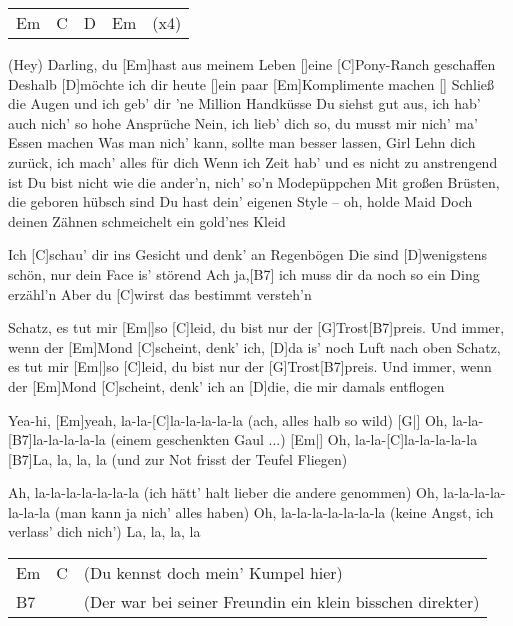 



\begin{guitar}
	{\footnotesize\begin{tabular}{l|l|l|l l}
			Em \optionalChord{B} & C & D \optionalChord{G} & Em \optionalChord{D} & (x4)
	\end{tabular}}

	\songsection{Strophe 1}
	(Hey) Darling, du [Em]hast aus meinem Leben []eine [C]Pony-Ranch geschaffen
	Deshalb [D]möchte ich dir heute []ein paar [Em]Komplimente machen []{}
	Schließ die Augen und ich geb' dir 'ne Million Handküsse
	Du siehst gut aus, ich hab' auch nich' so hohe Ansprüche
	Nein, ich lieb' dich so, du musst mir nich' ma' Essen machen
	Was man nich' kann, sollte man besser lassen, Girl
	Lehn dich zurück, ich mach' alles für dich
	Wenn ich Zeit hab' und es nicht zu anstrengend ist
	Du bist nicht wie die ander'n, nich' so'n Modepüppchen
	Mit großen Brüsten, die geboren hübsch sind
	Du hast dein' eigenen Style – oh, holde Maid
	Doch deinen Zähnen schmeichelt ein gold'nes Kleid
	
	Ich [C]schau' dir ins Gesicht und denk' an Regenbögen
	Die sind [D]wenigstens schön, nur dein Face is' störend
	Ach ja,[B7] ich muss dir da noch so ein Ding erzähl'n
	Aber du [C]wirst das bestimmt versteh'n
	
	Schatz, es tut mir [Em|]{so }[C]leid, du bist nur der [G]Trost[B7]preis.
	Und immer, wenn der [Em]Mond [C]scheint, denk' ich, [D]da is' noch Luft nach oben
	Schatz, es tut mir [Em|]{so }[C]leid, du bist nur der [G]Trost[B7]preis.
	Und immer, wenn der [Em]Mond [C]scheint, denk' ich an [D]die, die mir damals entflogen
	
	\pagebreak
	Yea-hi, [Em]yeah, la-la-[C]la-la-la-la-la (ach, alles halb so wild)
	[G|] Oh, la-la-[B7]la-la-la-la-la (einem geschenkten Gaul ...)
	[Em|] Oh, la-la-[C]la-la-la-la-la
	[B7]La, la, la, la (und zur Not frisst der Teufel Fliegen)
	
	Ah, la-la-la-la-la-la-la (ich hätt' halt lieber die andere genommen)
	Oh, la-la-la-la-la-la-la (man kann ja nich' alles haben)
	Oh, la-la-la-la-la-la-la (keine Angst, ich verlass' dich nich')
	La, la, la, la
	{\footnotesize\begin{tabular}{l|l l}
			Em & C & {\small(Du kennst doch mein' Kumpel hier)} \\
			B7 & & {\small(Der war bei seiner Freundin ein klein bisschen direkter)}
	\end{tabular}}
	

\end{guitar}
